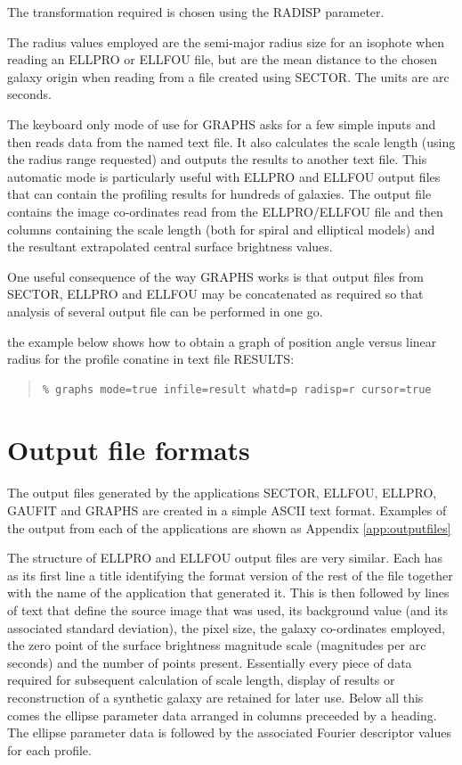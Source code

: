 \documentclass[twoside,11pt]{article}
\newenvironment{myquote}{\begin{quote}\begin{small}}{\end{small}\end{quote}}
\begin{document}
The transformation required is chosen using the RADISP parameter.

The radius values employed are the semi-major radius size for an isophote 
when reading an ELLPRO or ELLFOU file, but are the mean distance to the 
chosen galaxy origin when reading from a file created using SECTOR. The 
units are arc seconds. 

The keyboard only mode of use for GRAPHS asks for a few simple inputs and then
reads data from the named text file. It also calculates the scale length 
(using the radius range requested) and outputs the results to another text 
file. This automatic mode is particularly useful with ELLPRO and ELLFOU 
output files that can contain the profiling results for hundreds of galaxies. 
The output file contains the image co-ordinates read from the ELLPRO/ELLFOU 
file and then columns containing the scale length (both for spiral and 
elliptical models) and the resultant extrapolated central surface 
brightness values.

One useful consequence of the way GRAPHS works is that output files from
SECTOR, ELLPRO and ELLFOU may be concatenated as required so that
analysis of several output file can be performed in one go.

the example below shows how to obtain a graph of position angle versus linear
radius for the profile conatine in text file RESULTS:

\begin{myquote}
\begin{verbatim}
% graphs mode=true infile=result whatd=p radisp=r cursor=true 
\end{verbatim}
\end{myquote}


\section{Output file formats}
\label{sec:output}

The output files generated by the applications SECTOR, ELLFOU,
ELLPRO, GAUFIT and GRAPHS are created in a simple ASCII text format. 
Examples of the output from each of the applications are shown as 
Appendix \ref{app:outputfiles}

The structure of ELLPRO and ELLFOU output files are very similar. 
Each has as its first line a title identifying the format version 
of the rest of the file together with the name of the application 
that generated it. This is then followed by lines of text
that define the source image that was used, its background 
value (and its associated standard deviation), the pixel size, the galaxy
co-ordinates employed, the zero point of the surface brightness
magnitude scale (magnitudes per arc seconds) and the number of points 
present. Essentially every piece of data required for subsequent
calculation of scale length, display of results or reconstruction of
a synthetic galaxy are retained for later use.
Below all this comes the ellipse parameter data arranged in columns preceeded
by a heading. The ellipse parameter data is followed by the associated 
Fourier descriptor values for each profile.
\end{document}
